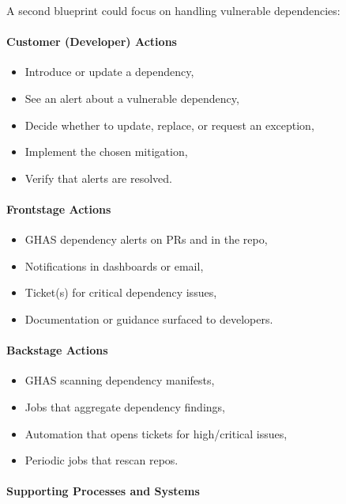 \documentclass[11pt]{article}
\begin{document}
A second blueprint could focus on handling vulnerable dependencies:

\paragraph{Customer (Developer) Actions}

\begin{itemize}
  \item Introduce or update a dependency,
  \item See an alert about a vulnerable dependency,
  \item Decide whether to update, replace, or request an exception,
  \item Implement the chosen mitigation,
  \item Verify that alerts are resolved.
\end{itemize}

\paragraph{Frontstage Actions}

\begin{itemize}
  \item GHAS dependency alerts on PRs and in the repo,
  \item Notifications in dashboards or email,
  \item Ticket(s) for critical dependency issues,
  \item Documentation or guidance surfaced to developers.
\end{itemize}

\paragraph{Backstage Actions}

\begin{itemize}
  \item GHAS scanning dependency manifests,
  \item Jobs that aggregate dependency findings,
  \item Automation that opens tickets for high/critical issues,
  \item Periodic jobs that rescan repos.
\end{itemize}

\paragraph{Supporting Processes and Systems}
\end{document}
